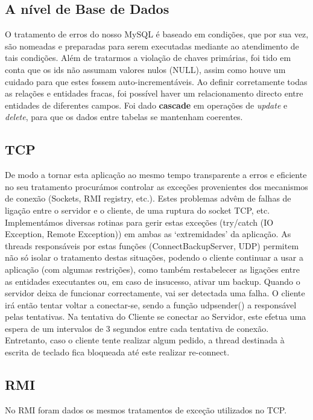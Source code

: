 \documentclass[12pt]{article} %
\begin{document}
\subsection{A nível de Base de Dados}
O tratamento de erros do nosso MySQL é baseado em condições, que por sua vez, são nomeadas e preparadas para serem executadas mediante ao atendimento de tais condições. 
Além de tratarmos a violação de chaves primárias, foi tido em conta que os ids não assumam valores nulos (NULL), assim como houve um cuidado para que estes fossem auto-incrementáveis. Ao definir corretamente todas as relações e entidades fracas, foi possível haver um relacionamento directo entre entidades de diferentes campos. Foi dado \textbf{cascade} em operações de \emph{update} e \emph{delete}, para que os dados entre tabelas se mantenham coerentes. 


\subsection{TCP}
De modo a tornar esta aplicação ao mesmo tempo transparente a erros e eficiente no seu tratamento procurámos controlar as exceções provenientes dos mecanismos de conexão (Sockets, RMI registry, etc.). Estes problemas advêm de falhas de ligação entre o servidor e o cliente, de uma ruptura do socket TCP, etc.
Implementámos diversas rotinas para gerir estas exceções (try/catch (IO Exception, Remote Exception)) em ambas as ‘extremidades’ da aplicação. As threads responsáveis por estas funções (ConnectBackupServer, UDP) permitem não só isolar o tratamento destas situações, podendo o cliente continuar a usar a aplicação (com algumas restrições), como também restabelecer as ligações entre as entidades executantes ou, em caso de insucesso, ativar um backup. 
Quando o servidor deixa de funcionar correctamente, vai ser detectada uma falha. O cliente irá então tentar voltar a conectar-se, sendo a função udpsender() a responsável pelas tentativas.
Na tentativa do Cliente se conectar ao Servidor, este efetua uma espera de um intervalos de 3 segundos entre cada tentativa de conexão. Entretanto, caso o cliente tente realizar algum pedido, a thread destinada à escrita de teclado fica bloqueada até este realizar re-connect.

\subsection{RMI}
No RMI foram dados os mesmos tratamentos de exceção utilizados no TCP.
\end{document}

